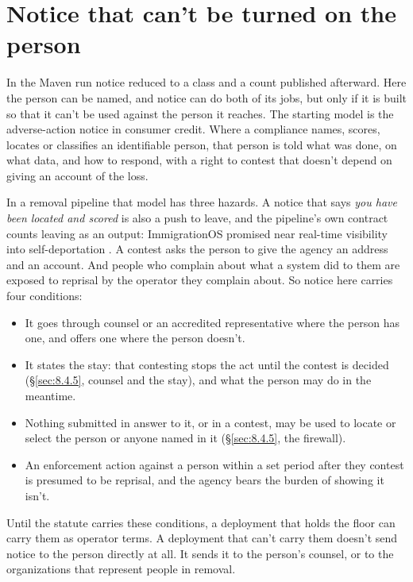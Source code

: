 \section{Notice that can't be turned on the person}
\label{sec:8.6}
In the Maven run notice reduced to a class and a count published afterward. Here the person can be named, and notice can do both of its jobs, but only if it is built so that it can't be used against the person it reaches. The starting model is the adverse-action notice in consumer credit. Where a compliance names, scores, locates or classifies an identifiable person, that person is told what was done, on what data, and how to respond, with a right to contest that doesn't depend on giving an account of the loss.

In a removal pipeline that model has three hazards. A notice that says \emph{you have been located and scored} is also a push to leave, and the pipeline's own contract counts leaving as an output: ImmigrationOS promised near real-time visibility into self-deportation \autocite{Ho2025ImmigrationOS}. A contest asks the person to give the agency an address and an account. And people who complain about what a system did to them are exposed to reprisal by the operator they complain about. So notice here carries four conditions:

\begin{itemize}
\item It goes through counsel or an accredited representative where the person has one, and offers one where the person doesn't.
\item It states the stay: that contesting stops the act until the contest is decided (\S\ref{sec:8.4.5}, counsel and the stay), and what the person may do in the meantime.
\item Nothing submitted in answer to it, or in a contest, may be used to locate or select the person or anyone named in it (\S\ref{sec:8.4.5}, the firewall).
\item An enforcement action against a person within a set period after they contest is presumed to be reprisal, and the agency bears the burden of showing it isn't.
\end{itemize}

Until the statute carries these conditions, a deployment that holds the floor can carry them as operator terms. A deployment that can't carry them doesn't send notice to the person directly at all. It sends it to the person's counsel, or to the organizations that represent people in removal.

